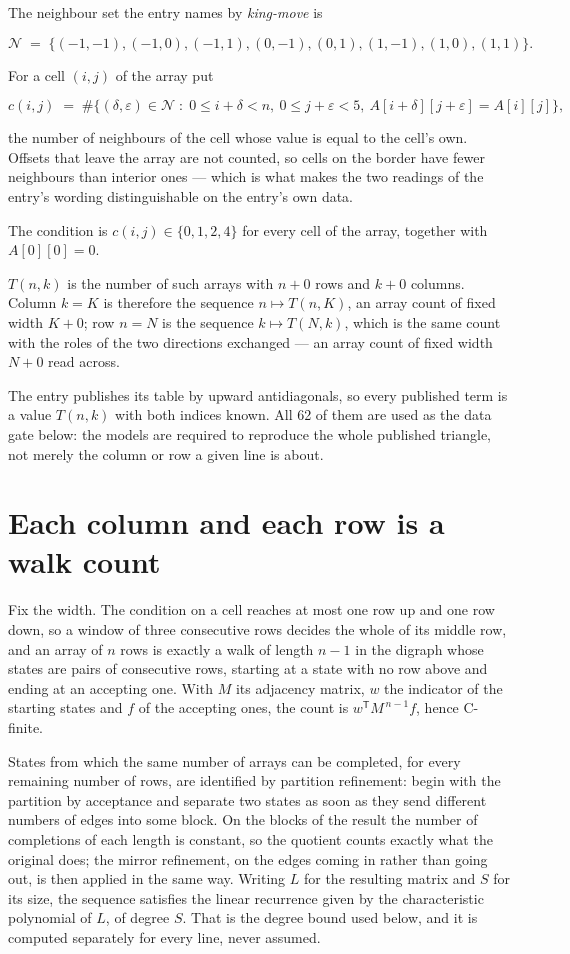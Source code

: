 \documentclass[11pt]{article}
\theoremstyle{definition}
\begin{document}
The neighbour set the entry names by {\itshape king-move} is

\[\mathcal{N} \;=\; \{(-1,-1), (-1,0), (-1,1), (0,-1), (0,1), (1,-1), (1,0), (1,1)\}.\]

For a cell $(i,j)$ of the array put

\[c(i,j) \;=\; \#\bigl\{(\delta,\varepsilon)\in\mathcal{N} \;:\; 0\le i+\delta<n,\ 0\le j+\varepsilon<5,\ A[i+\delta][j+\varepsilon] = A[i][j]\bigr\},\]

the number of neighbours of the cell whose value is equal to the cell's own. Offsets that leave the array are not counted, so cells on the border have fewer neighbours than interior ones --- which is what makes the two readings of the entry's wording distinguishable on the entry's own data.

The condition is $c(i,j) \in \{0, 1, 2, 4\}$ for every cell of the array, together with $A[0][0]=0$.

$T(n,k)$ is the number of such arrays with $n + 0$ rows and $k + 0$ columns. Column $k = K$ is therefore the sequence $n \mapsto T(n,K)$, an array count of fixed width $K + 0$; row $n = N$ is the sequence $k \mapsto T(N,k)$, which is the same count with the roles of the two directions exchanged --- an array count of fixed width $N + 0$ read across.

The entry publishes its table by upward antidiagonals, so every published term is a value $T(n,k)$ with both indices known. All 62 of them are used as the data gate below: the models are required to reproduce the whole published triangle, not merely the column or row a given line is about.

\section{Each column and each row is a walk count}

Fix the width. The condition on a cell reaches at most one row up and one row down, so a window of three consecutive rows decides the whole of its middle row, and an array of $n$ rows is exactly a walk of length $n-1$ in the digraph whose states are pairs of consecutive rows, starting at a state with no row above and ending at an accepting one. With $M$ its adjacency matrix, $w$ the indicator of the starting states and $f$ of the accepting ones, the count is $w^{\mathsf T}M^{\,n-1}f$, hence C-finite.

States from which the same number of arrays can be completed, for every remaining number of rows, are identified by partition refinement: begin with the partition by acceptance and separate two states as soon as they send different numbers of edges into some block. On the blocks of the result the number of completions of each length is constant, so the quotient counts exactly what the original does; the mirror refinement, on the edges coming in rather than going out, is then applied in the same way. Writing $L$ for the resulting matrix and $S$ for its size, the sequence satisfies the linear recurrence given by the characteristic polynomial of $L$, of degree $S$. That is the degree bound used below, and it is computed separately for every line, never assumed.
\end{document}
